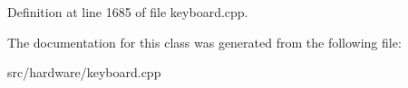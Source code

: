 Definition at line 1685 of file keyboard.\-cpp.



The documentation for this class was generated from the following file\-:\begin{DoxyCompactItemize}
\item 
src/hardware/keyboard.\-cpp\end{DoxyCompactItemize}
